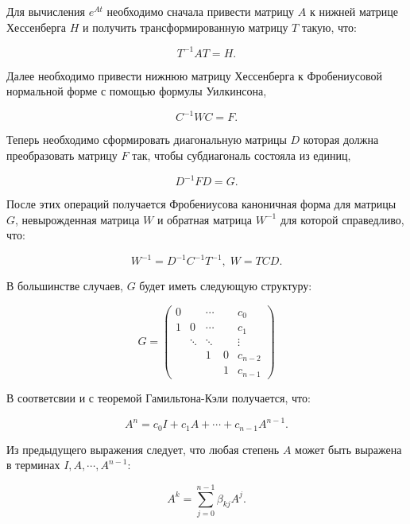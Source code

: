\documentclass[master, och, diploma, times]{sty/SCWorks}
\theoremstyle{plain}
\theoremstyle{definition}
\numberwithin{equation}{section}
\begin{document}
Для вычисления $e^{At}$ необходимо сначала привести матрицу $A$ к нижней матрице Хессенберга $H$ и получить трансформированную матрицу $T$ такую, что:

\begin{equation}
T^{-1}AT=H.
\end{equation} 

\noindent Далее необходимо привести нижнюю матрицу Хессенберга к Фробениусовой нормальной форме с помощью формулы Уилкинсона,

\begin{equation}
C^{-1}WC=F.
\end{equation}

\noindent Теперь необходимо сформировать диагональную матрицы $D$ которая должна преобразовать матрицу $F$ так, чтобы субдиагональ состояла из единиц,

\begin{equation}
D^{-1}FD=G.
\end{equation}

\noindent После этих операций получается Фробениусова каноничная форма для матрицы $G$, невырожденная матрица $W$ и обратная матрица $W^{-1}$ для которой справедливо, что:

\begin{equation}
W^{-1}=D^{-1}C^{-1}T^{-1}, \; W=TCD.
\end{equation}
 
\noindent В большинстве случаев, $G$ будет иметь следующую структуру:

\begin{equation}G=
\begin{pmatrix}
0 & & \cdots & & c_0\\
1 & 0 & \cdots & & c_1\\
& \ddots & \ddots & & \vdots \\
& & 1 & 0 & c_{n-2} \\
& & & 1 & c_{n-1}
\end{pmatrix}
\end{equation}
 
\noindent В соответсвии и с теоремой Гамильтона-Кэли \cite{bib:algebra:roitenberg} получается, что:

\begin{equation}
A^n=c_0I+c_1A+\cdots+c_{n-1}A^{n-1}.
\end{equation}

Из предыдущего выражения следует, что любая степень $A$ может быть выражена в терминах $I, A, \cdots, A^{n-1}$:

\begin{equation}
A^k=\sum\limits_{j=0}^{n-1} \beta_{kj}A^j.
\end{equation}
\end{document}
